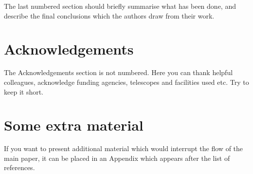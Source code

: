 \documentclass[fleqn,usenatbib]{mnras}
\begin{document}
The last numbered section should briefly summarise what has been done, and describe
the final conclusions which the authors draw from their work.

\section*{Acknowledgements}

The Acknowledgements section is not numbered. Here you can thank helpful
colleagues, acknowledge funding agencies, telescopes and facilities used etc.
Try to keep it short.










\appendix

\section{Some extra material}

If you want to present additional material which would interrupt the
flow of the main paper, it can be placed in an Appendix which appears
after the list of references.



\bsp	%
\label{lastpage}
\end{document}
